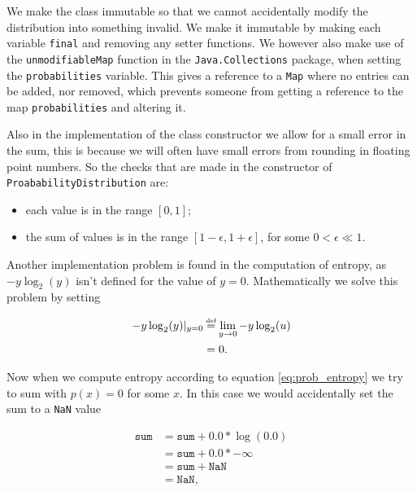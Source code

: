 \documentclass[12pt,twoside,notitlepage]{report}
\newcommand\defeq{\stackrel{\mathclap{\normalfont\tiny\mbox{def}}}{=}}
\begin{document}
                We make the class immutable so that we cannot accidentally modify the distribution into something 
                invalid. We make it immutable by making each variable \texttt{final} and removing any setter functions. 
                We however also make use of the \texttt{unmodifiableMap} function in the \texttt{Java.Collections} 
                package, when setting the \texttt{probabilities} variable. This gives a reference to a \texttt{Map} 
                where no entries can be added, nor removed, which prevents someone from getting a reference to the map
                \texttt{probabilities} and altering it.

                Also in the implementation of the class constructor we allow for a small error in the sum, this is 
                because we will often have small errors from rounding in floating point numbers. So the checks that 
                are made in the constructor of \texttt{ProababilityDistribution} are:
                \begin{itemize}
                    \item 
                        each value is in the range $[0,1]$;
                    \item 
                        the sum of values is in the range $[1-\epsilon,1+\epsilon]$, for some $0 < \epsilon \ll 1$.
                \end{itemize}

                Another implementation problem is found in the computation of entropy, as $-y\log_2(y)$ isn't defined for 
                the value of $y=0$. Mathematically we solve this problem by setting

                \begin{align}
                    -y\log_2(y)|_{y=0} & \defeq \lim_{y\to 0} -y \log_2(u) \\
                        & = 0.
                \end{align}

                Now when we compute entropy according to equation \ref{eq:prob_entropy} we try to sum with $p(x)=0$ for 
                some $x$. In this case we would accidentally set the sum to a \texttt{NaN} value

                \begin{align}
                  \texttt{sum} &= \texttt{sum} + 0.0 * \log(0.0) \\
                    &= \texttt{sum} + 0.0 * -\infty \\
                    &= \texttt{sum} + \texttt{NaN}\\
                    &= \texttt{NaN},
                \end{align}
\end{document}
